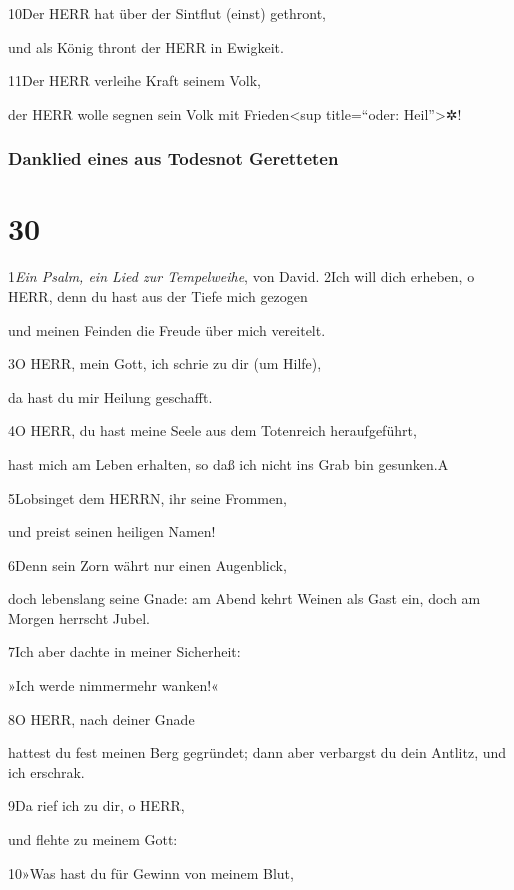10Der HERR hat über der Sintflut (einst) gethront,

und als König thront der HERR in Ewigkeit.

11Der HERR verleihe Kraft seinem Volk,

der HERR wolle segnen sein Volk mit Frieden\textless sup title=``oder:
Heil''\textgreater✲!

\hypertarget{danklied-eines-aus-todesnot-geretteten}{%
\subsubsection{Danklied eines aus Todesnot
Geretteten}\label{danklied-eines-aus-todesnot-geretteten}}

\hypertarget{section-29}{%
\section{30}\label{section-29}}

1\emph{Ein Psalm, ein Lied zur Tempelweihe}, von David. 2Ich will dich
erheben, o HERR, denn du hast aus der Tiefe mich gezogen

und meinen Feinden die Freude über mich vereitelt.

3O HERR, mein Gott, ich schrie zu dir (um Hilfe),

da hast du mir Heilung geschafft.

4O HERR, du hast meine Seele aus dem Totenreich heraufgeführt,

hast mich am Leben erhalten, so daß ich nicht ins Grab bin gesunken.{A}

5Lobsinget dem HERRN, ihr seine Frommen,

und preist seinen heiligen Namen!

6Denn sein Zorn währt nur einen Augenblick,

doch lebenslang seine Gnade: am Abend kehrt Weinen als Gast ein, doch am
Morgen herrscht Jubel.

7Ich aber dachte in meiner Sicherheit:

»Ich werde nimmermehr wanken!«

8O HERR, nach deiner Gnade

hattest du fest meinen Berg gegründet; dann aber verbargst du dein
Antlitz, und ich erschrak.

9Da rief ich zu dir, o HERR,

und flehte zu meinem Gott:

10»Was hast du für Gewinn von meinem Blut,

